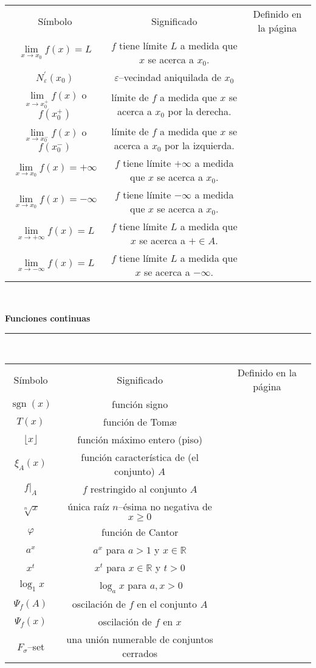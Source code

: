 \documentclass[a4,paper]{article}
\newcommand{\centrado}[1]{
	\ \\[.1\baselineskip]
	{\Large\bfseries\centering #1\par}
	\hrule
	\ \\[.1\baselineskip]
}
\begin{document}
\begin{tabular}{ccc}
	Símbolo & Significado & Definido en la página \\
	$\lim\limits_{x\to x_{0}}f(x)=L$ & $f$ tiene límite $L$ a medida que $x$ se acerca a $x_{0}$. & \\
	$N^{\prime}_{\varepsilon}(x_{0})$ & $\varepsilon$--vecindad aniquilada de $x_{0}$ & \\
	$\lim\limits_{x\to x^{+}_{0}}f(x)$ o $f\left(x^{+}_{0}\right)$ & límite de $f$ a medida que $x$ se acerca a $x_{0}$ por la derecha. & \\
	$\lim\limits_{x\to x^{-}_{0}}f(x)$ o $f\left(x^{-}_{0}\right)$ & límite de $f$ a medida que $x$ se acerca a $x_{0}$ por la izquierda. & \\
	$\lim\limits_{x\to x_{0}}f(x)=+\infty$ & $f$ tiene límite $+\infty$ a medida que $x$ se acerca a $x_{0}$. & \\
	$\lim\limits_{x\to x_{0}}f(x)=-\infty$ & $f$ tiene límite $-\infty$ a medida que $x$ se acerca a $x_{0}$. & \\
	$\lim\limits_{x\to+\infty}f(x)=L$ & $f$ tiene límite $L$ a medida que $x$ se acerca a $+\in{A}$. & \\
	$\lim\limits_{x\to-\infty}f(x)=L$ & $f$ tiene límite $L$ a medida que $x$ se acerca a $-\infty$. & \\
\end{tabular}
\centrado{Funciones continuas}
\begin{tabular}{ccc}
	Símbolo & Significado & Definido en la página \\
	$\operatorname{sgn}(x)$ & función signo & \\
	$T(x)$ & función de Tom\ae & \\
	$\lfloor x\rfloor$ & función máximo entero (piso) & \\
	$\xi_{A}(x)$ & función característica de (el conjunto) $A$ & \\
	$f{\left.\right|}_{A}$ & $f$ restringido al conjunto $A$ & \\
	$\sqrt[n]{x}$ & única raíz $n$--ésima no negativa de $x\geq0$& \\
	$\varphi$ & función de Cantor & \\
	$a^{x}$ & $a^{x}$ para $a>1$ y $x\in\mathbb{R}$ & \\
	$x^{t}$ & $x^{t}$ para $x\in\mathbb{R}$ y $t>0$ & \\
	$\log_{1}x$ & $\log_{a}x$ para $a,x>0$ & \\
	$\Psi_{f}(A)$ & oscilación de $f$ en el conjunto $A$ & \\
	$\Psi_{f}(x)$ & oscilación de $f$ en $x$ & \\
	$F_{\sigma}$--set & una unión numerable de conjuntos cerrados & \\
\end{tabular}
\end{document}

